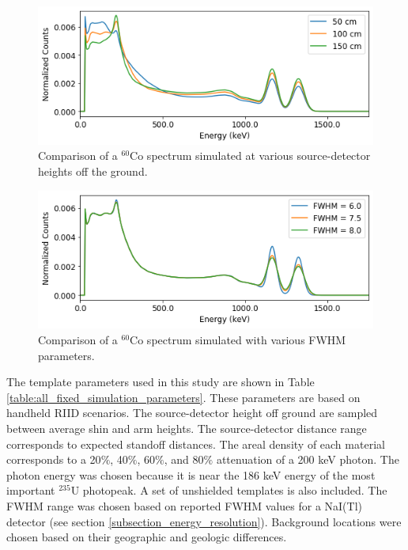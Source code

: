 \begin{figure}[H]
\centering
\includegraphics[width=0.75\linewidth]{images/sim_spectra_height_comparison}
\caption{Comparison of a $^{60}$Co spectrum simulated at various source-detector heights off the ground.}
\label{fig:sim_spectra_height_comparison}
\end{figure}


\begin{figure}[H]
\centering
\includegraphics[width=0.75\linewidth]{images/sim_spectra_FWHM_comparison}
\caption{Comparison of a $^{60}$Co spectrum simulated with various FWHM parameters.}
\label{fig:sim_spectra_FWHM_comparison}
\end{figure}






The template parameters used in this study are shown in Table \ref{table:all_fixed_simulation_parameters}. These parameters are based on handheld RIID scenarios. The source-detector height off ground are sampled between average shin and arm heights. The source-detector distance range corresponds to expected standoff distances. The areal density of each material corresponds to a 20$\%$, 40$\%$, 60$\%$, and 80$\%$ attenuation of a 200 keV photon. The photon energy was chosen because it is near the 186 keV energy of the most important $^{235}$U photopeak. A set of unshielded templates is also included. The FWHM range was chosen based on reported FWHM values for a NaI(Tl) detector (see section \ref{subsection_energy_resolution}). Background locations were chosen based on their geographic and geologic differences.

